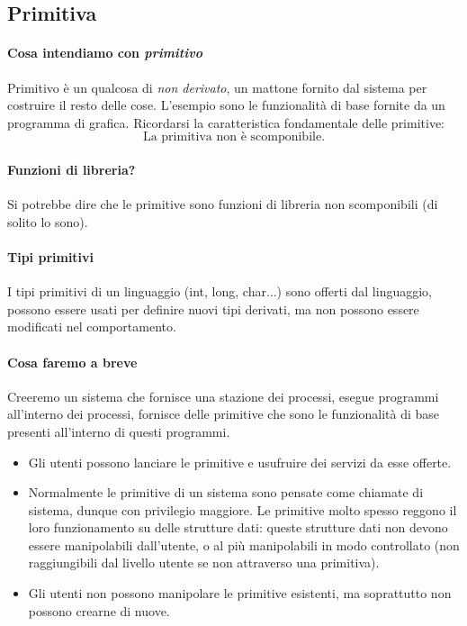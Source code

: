 \subsection{Primitiva}
\paragraph{Cosa intendiamo con \emph{primitivo}} Primitivo è un qualcosa di \textit{non derivato}, un mattone fornito dal sistema per costruire il resto delle cose. L'esempio sono le funzionalità di base fornite da un programma di grafica. Ricordarsi la caratteristica fondamentale delle primitive:
\[\boxed{\text{La primitiva non è scomponibile.}}\]
\paragraph{Funzioni di libreria?} Si potrebbe dire che le primitive sono funzioni di libreria non scomponibili (di solito lo sono).
\paragraph{Tipi primitivi} I tipi primitivi di un linguaggio (int, long, char...) sono offerti dal linguaggio, possono essere usati per definire nuovi tipi derivati, ma non possono essere modificati nel comportamento.

\paragraph{Cosa faremo a breve} Creeremo un sistema che fornisce una stazione dei processi, esegue programmi all'interno dei processi, fornisce delle primitive che sono le funzionalità di base presenti all'interno di questi programmi.
\begin{itemize}
	\item Gli utenti possono lanciare le primitive e usufruire dei servizi da esse offerte.
	\item Normalmente le primitive di un sistema sono pensate come {chiamate di sistema}, dunque con privilegio maggiore. Le primitive molto spesso reggono il loro funzionamento su delle strutture dati: queste strutture dati non devono essere manipolabili dall'utente, o al più manipolabili in modo controllato (non raggiungibili dal livello utente se non attraverso una primitiva).
	\item Gli utenti non possono manipolare le primitive esistenti, ma soprattutto non possono crearne di nuove.
\end{itemize}

